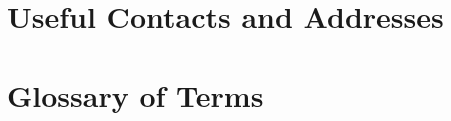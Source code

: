 \documentclass[11pt,a4paper]{book}
\begin{document}
















\backmatter

\appendix
\chapter{Useful Contacts and Addresses}
\chapter{Glossary of Terms}
\end{document}
